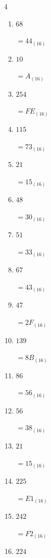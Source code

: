 \begin{multicols}{4}
\begin{enumerate}
        $=56_{(16)}$

  \item $68$

        $=44_{(16)}$

\columnbreak %

\resetques

  \item $10$

        $=A_{(16)}$

  \item $254$

        $=FE_{(16)}$

  \item $115$

        $=73_{(16)}$

  \item $21$

        $=15_{(16)}$

  \item $48$

        $=30_{(16)}$

  \item $51$

        $=33_{(16)}$

  \item $67$

        $=43_{(16)}$

  \item $47$

        $=2F_{(16)}$

  \item $139$

        $=8B_{(16)}$

  \item $86$

        $=56_{(16)}$

  \item $56$

        $=38_{(16)}$

  \item $21$

        $=15_{(16)}$

  \item $225$

        $=E1_{(16)}$

  \item $242$

        $=F2_{(16)}$

  \item $224$


\end{enumerate}
\end{multicols}
